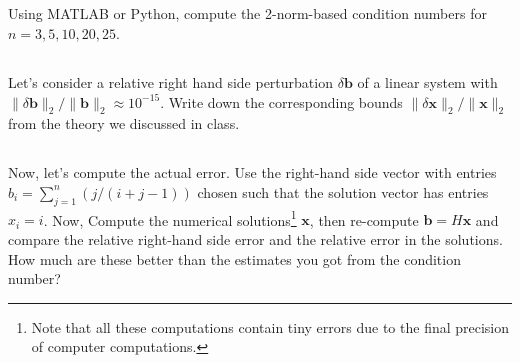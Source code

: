 \documentclass[11pt,letterpaper]{article}
\begin{document}
\subsection{}
Using MATLAB or Python, compute the 2-norm-based condition
  numbers for $n=3,5,10,20,25$.  
  
\subsection{}
  Let's consider a relative right hand
  side perturbation $\delta\boldsymbol b$ of a linear system with
  $\|\delta\boldsymbol b\|_2/\|\boldsymbol b\|_2\approx
  10^{-15}$. Write down the corresponding bounds $\|\delta\boldsymbol
  x\|_2/\|\boldsymbol x\|_2$ from the theory we discussed in class.

\subsection{}
  Now, let's compute the actual error. Use the right-hand side vector
  with entries $b_i = \sum_{j=1}^n(j/(i+j-1))$ chosen such that the
  solution vector has entries $x_i=i$. Now, Compute the numerical
  solutions\footnote{Note that all these computations contain tiny
    errors due to the final precision of computer computations.}
  $\boldsymbol x$, then re-compute $\boldsymbol b=H\boldsymbol x$ and
  compare the relative right-hand side error and the relative error
  in the solutions. How much are these better than the estimates you
  got from the condition number?
    
    
% 
% 
\end{document}
